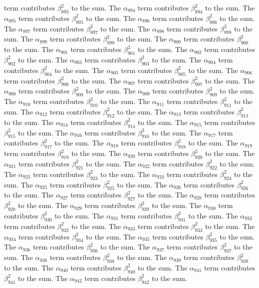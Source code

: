 \begin{lemma}
term contributes $\beta_{893}^{2}$ to the sum. The $\alpha_{894}$ term contributes $\beta_{894}^{2}$ to the sum. The $\alpha_{895}$ term contributes $\beta_{895}^{2}$ to the sum. The $\alpha_{896}$ term contributes $\beta_{896}^{2}$ to the sum. The $\alpha_{897}$ term contributes $\beta_{897}^{2}$ to the sum. The $\alpha_{898}$ term contributes $\beta_{898}^{2}$ to the sum. The $\alpha_{899}$ term contributes $\beta_{899}^{2}$ to the sum. The $\alpha_{900}$ term contributes $\beta_{900}^{2}$ to the sum. The $\alpha_{901}$ term contributes $\beta_{901}^{2}$ to the sum. The $\alpha_{902}$ term contributes $\beta_{902}^{2}$ to the sum. The $\alpha_{903}$ term contributes $\beta_{903}^{2}$ to the sum. The $\alpha_{904}$ term contributes $\beta_{904}^{2}$ to the sum. The $\alpha_{905}$ term contributes $\beta_{905}^{2}$ to the sum. The $\alpha_{906}$ term contributes $\beta_{906}^{2}$ to the sum. The $\alpha_{907}$ term contributes $\beta_{907}^{2}$ to the sum. The $\alpha_{908}$ term contributes $\beta_{908}^{2}$ to the sum. The $\alpha_{909}$ term contributes $\beta_{909}^{2}$ to the sum. The $\alpha_{910}$ term contributes $\beta_{910}^{2}$ to the sum. The $\alpha_{911}$ term contributes $\beta_{911}^{2}$ to the sum. The $\alpha_{912}$ term contributes $\beta_{912}^{2}$ to the sum. The $\alpha_{913}$ term contributes $\beta_{913}^{2}$ to the sum. The $\alpha_{914}$ term contributes $\beta_{914}^{2}$ to the sum. The $\alpha_{915}$ term contributes $\beta_{915}^{2}$ to the sum. The $\alpha_{916}$ term contributes $\beta_{916}^{2}$ to the sum. The $\alpha_{917}$ term contributes $\beta_{917}^{2}$ to the sum. The $\alpha_{918}$ term contributes $\beta_{918}^{2}$ to the sum. The $\alpha_{919}$ term contributes $\beta_{919}^{2}$ to the sum. The $\alpha_{920}$ term contributes $\beta_{920}^{2}$ to the sum. The $\alpha_{921}$ term contributes $\beta_{921}^{2}$ to the sum. The $\alpha_{922}$ term contributes $\beta_{922}^{2}$ to the sum. The $\alpha_{923}$ term contributes $\beta_{923}^{2}$ to the sum. The $\alpha_{924}$ term contributes $\beta_{924}^{2}$ to the sum. The $\alpha_{925}$ term contributes $\beta_{925}^{2}$ to the sum. The $\alpha_{926}$ term contributes $\beta_{926}^{2}$ to the sum. The $\alpha_{927}$ term contributes $\beta_{927}^{2}$ to the sum. The $\alpha_{928}$ term contributes $\beta_{928}^{2}$ to the sum. The $\alpha_{929}$ term contributes $\beta_{929}^{2}$ to the sum. The $\alpha_{930}$ term contributes $\beta_{930}^{2}$ to the sum. The $\alpha_{931}$ term contributes $\beta_{931}^{2}$ to the sum. The $\alpha_{932}$ term contributes $\beta_{932}^{2}$ to the sum. The $\alpha_{933}$ term contributes $\beta_{933}^{2}$ to the sum. The $\alpha_{934}$ term contributes $\beta_{934}^{2}$ to the sum. The $\alpha_{935}$ term contributes $\beta_{935}^{2}$ to the sum. The $\alpha_{936}$ term contributes $\beta_{936}^{2}$ to the sum. The $\alpha_{937}$ term contributes $\beta_{937}^{2}$ to the sum. The $\alpha_{938}$ term contributes $\beta_{938}^{2}$ to the sum. The $\alpha_{939}$ term contributes $\beta_{939}^{2}$ to the sum. The $\alpha_{940}$ term contributes $\beta_{940}^{2}$ to the sum. The $\alpha_{941}$ term contributes $\beta_{941}^{2}$ to the sum. The $\alpha_{942}$ term contributes $\beta_{942}^{2}$ to the sum. 
\end{lemma}
